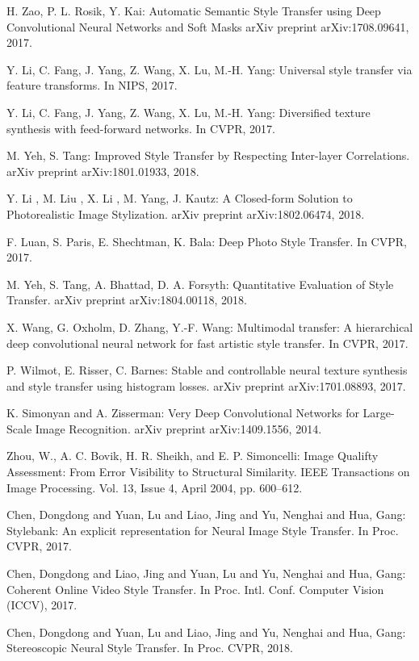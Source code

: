 \documentclass{llncs}
\begin{document}
\begin{thebibliography}{5}
H. Zao, P. L. Rosik, Y. Kai:
Automatic Semantic Style Transfer using Deep Convolutional Neural Networks and Soft Masks
arXiv preprint arXiv:1708.09641, 2017.

Y. Li, C. Fang, J. Yang, Z. Wang, X. Lu, M.-H. Yang:
Universal style transfer via feature transforms.
In NIPS, 2017.

Y. Li, C. Fang, J. Yang, Z. Wang, X. Lu, M.-H. Yang:
Diversified texture synthesis with feed-forward networks.
In CVPR, 2017.

M. Yeh, S. Tang:
Improved Style Transfer by Respecting Inter-layer Correlations.
arXiv preprint arXiv:1801.01933, 2018.

Y. Li , M. Liu , X. Li , M. Yang, J. Kautz:
A Closed-form Solution to Photorealistic Image Stylization.
arXiv preprint arXiv:1802.06474, 2018.

F. Luan, S. Paris, E. Shechtman, K. Bala:
Deep Photo Style Transfer.
In CVPR, 2017.

M. Yeh, S. Tang, A. Bhattad, D. A. Forsyth:
Quantitative Evaluation of Style Transfer.
arXiv preprint arXiv:1804.00118, 2018.

 X. Wang, G. Oxholm, D. Zhang, Y.-F. Wang:
Multimodal transfer: A hierarchical deep convolutional neural network for fast artistic style transfer.
In CVPR, 2017.

 P. Wilmot, E. Risser, C. Barnes:
Stable and controllable neural texture synthesis and style transfer using histogram losses.
arXiv preprint arXiv:1701.08893, 2017.

 K. Simonyan and A. Zisserman:
Very Deep Convolutional Networks for Large-Scale Image Recognition.
arXiv preprint arXiv:1409.1556, 2014.

 Zhou, W., A. C. Bovik, H. R. Sheikh, and E. P. Simoncelli:
Image Qualifty Assessment: From Error Visibility to Structural Similarity.
IEEE Transactions on Image Processing. Vol. 13, Issue 4, April 2004, pp. 600–612.

 Chen, Dongdong and Yuan, Lu and Liao, Jing and Yu, Nenghai and Hua, Gang: Stylebank: An explicit representation for Neural Image Style Transfer. In Proc. CVPR, 2017.

 Chen, Dongdong and Liao, Jing and Yuan, Lu and Yu, Nenghai and Hua, Gang: Coherent Online Video Style Transfer. In Proc. Intl. Conf. Computer Vision (ICCV), 2017.

 Chen, Dongdong and Yuan, Lu and Liao, Jing and Yu, Nenghai and Hua, Gang: Stereoscopic Neural Style Transfer. In Proc. CVPR, 2018.

\end{thebibliography}
\end{document}
